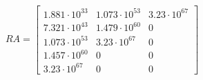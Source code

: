 \begin{equation}
RA = \left[\begin{matrix}1.881 \cdot 10^{33} & 1.073 \cdot 10^{53} & 3.23 \cdot 10^{67}\\7.321 \cdot 10^{43} & 1.479 \cdot 10^{60} & 0\\1.073 \cdot 10^{53} & 3.23 \cdot 10^{67} & 0\\1.457 \cdot 10^{60} & 0 & 0\\3.23 \cdot 10^{67} & 0 & 0\end{matrix}\right]
\end{equation}

